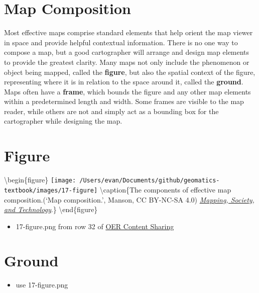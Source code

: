 \documentclass[
]{book}
\providecommand{\tightlist}{%
  \setlength{\itemsep}{0pt}\setlength{\parskip}{0pt}}
\begin{document}
\hypertarget{map-composition}{%
\section{Map Composition}\label{map-composition}}

Most effective maps comprise standard elements that help orient the map viewer in space and provide helpful contextual information. There is no one way to compose a map, but a good cartographer will arrange and design map elements to provide the greatest clarity. Many maps not only include the phenomenon or object being mapped, called the \textbf{figure}, but also the spatial context of the figure, representing where it is in relation to the space around it, called the \textbf{ground}. Maps often have a \textbf{frame}, which bounds the figure and any other map elements within a predetermined length and width. Some frames are visible to the map reader, while others are not and simply act as a bounding box for the cartographer while designing the map.

\hypertarget{figure}{%
\section{Figure}\label{figure}}

\textbackslash begin\{figure\}
\texttt{[image: /Users/evan/Documents/github/geomatics-textbook/images/17-figure]} \textbackslash caption\{The components of effective map composition.(`Map composition.', \citet{Steven} Manson, CC BY-NC-SA 4.0) \href{https://open.lib.umn.edu/mapping/chapter/4-design-and-symbolization/\#return-footnote-399-1}{\emph{Mapping, Society, and Technology}}.\}\label{fig:17-figure}
\textbackslash end\{figure\}

\begin{itemize}
\tightlist
\item
  17-figure.png from row 32 of \href{https://docs.google.com/spreadsheets/d/1LqzXn00wMeIjHWstNT3tMImNDZirLGc3g72jFOQc_8I/edit\#gid=817407192}{OER Content Sharing}
\end{itemize}

\hypertarget{ground}{%
\section{Ground}\label{ground}}

\begin{itemize}
\tightlist
\item
  use 17-figure.png
\end{itemize}
\end{document}

